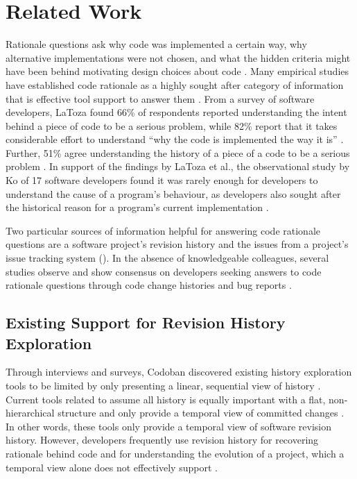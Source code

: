 \chapter{Related Work}
\label{ch:Related-Work}

Rationale questions ask why code was implemented a certain way, why alternative implementations were not chosen, and what the hidden criteria might have been behind motivating design choices about code \cite{latoza_hard-answer_2010}.
Many empirical studies have established code rationale as a highly sought after category of information that is effective tool support to answer them \cite{latoza_maintaining_2006, latoza_hard-answer_2010, ko_information_2007}. 
From a survey of software developers, LaToza \etal found 66\% of respondents reported understanding the intent behind a piece of code to be a serious problem, 
while 82\% report that it takes considerable effort to understand ``why the code is implemented the way it is'' \cite{latoza_maintaining_2006}.
Further, 51\% agree understanding the history of a piece of a code to be a serious problem \cite{latoza_maintaining_2006}.
In support of the findings by LaToza et al., the observational study by Ko \etal of 17 software developers found it was rarely enough for developers to understand the cause of a program's behaviour, as developers also sought after the historical reason for a program's current implementation \cite{ko_information_2007}.

Two particular sources of information helpful for answering code rationale questions are a software project's revision history and the issues from a project's issue tracking system (). 
In the absence of knowledgeable colleagues, several studies observe and show consensus on developers seeking answers to code rationale questions through code change histories and bug reports \cite{ko_information_2007, codoban_software_2015, robillard_turnover-induced_2021}.

\section{Existing Support for Revision History Exploration}

Through interviews and surveys, Codoban \etal discovered existing history exploration tools to be limited by only presenting a linear, sequential view of history \cite{codoban_software_2015}.
Current tools related to  assume all history is equally important with a flat, non-hierarchical structure and only provide a temporal view of committed changes \cite{codoban_software_2015}.
In other words, these tools only provide a temporal view of software revision history.
However, developers frequently use revision history for recovering rationale behind code and for understanding the evolution of a project, which a temporal view alone does not effectively support \cite{codoban_software_2015}.

